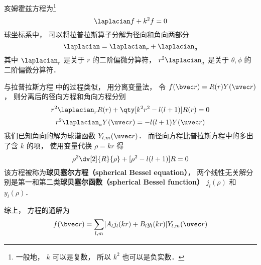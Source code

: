 

亥姆霍兹方程为\footnote{一般地， $k$ 可以是复数， 所以 $k^2$ 也可以是负实数．}
\begin{equation}
\laplacian f + k^2 f = 0
\end{equation}
球坐标系中， 可以将拉普拉斯算子分解为径向和角向两部分
\begin{equation}
\laplacian = \laplacian_r + \laplacian_{a}
\end{equation}
其中 $\laplacian_r$ 是关于 $r$ 的二阶偏微分算符， $r^2\laplacian_{a}$ 是关于 $\theta, \phi$ 的二阶偏微分算符．

与拉普拉斯方程 中的过程类似， 用分离变量法， 令 $f(\bvec r) = R(r) Y(\uvec r)$， 则分离后的径向方程和角向方程分别
\begin{equation}
r^2\laplacian_r R(r) + \qty[k^2 r^2 - l(l+1)] R(r) = 0
\end{equation}
\begin{equation}
r^2 \laplacian_{a} Y(\uvec r) = -l(l+1) Y(\uvec r)
\end{equation}
我们已知角向的解为球谐函数 $Y_{l,m}(\uvec r)$． 而径向方程比普拉斯方程中的多出了含 $k$ 的项， 使用变量代换 $\rho = kr$ 得
\begin{equation}
\rho^2\dv[2]{R}{\rho} + [\rho^2 - l(l+1)] R = 0
\end{equation}
该方程被称为\textbf{球贝塞尔方程（spherical Bessel equation）}， 两个线性无关解分别是第一和第二类\textbf{球贝塞尔函数（spherical Bessel function）} $j_l(\rho)$ 和 $y_l(\rho)$．

综上， 方程的通解为
\begin{equation}
f(\bvec r) = \sum_{l,m} [A_l j_l(kr) + B_l y_l(kr)] Y_{l,m}(\uvec r)
\end{equation}
